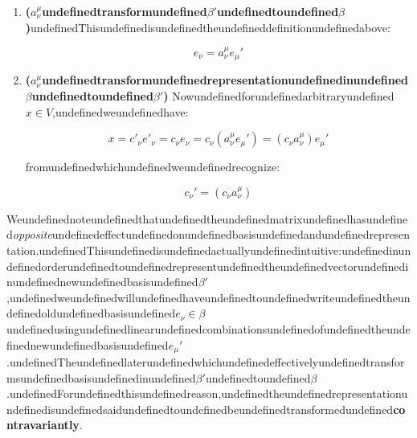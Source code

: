 \begin{enumerate}
\item \textbf{($a_{\nu}^{\mu}$undefinedtransformundefined$\beta'$undefinedtoundefined$\beta$)}undefinedThisundefinedisundefinedtheundefineddefinitionundefinedabove:

\begin{equation}
e_\nu = a_{\nu}^{\mu} e_{\mu}'
\end{equation}


\item \textbf{($a_{\nu}^{\mu}$undefinedtransformundefinedrepresentationundefinedinundefined$\beta$undefinedtoundefined$\beta'$)}
Nowundefinedforundefinedarbitraryundefined$x\in V$,undefinedweundefinedhave:

\begin{equation}
x=c'_{\nu}e'_{\nu}=c_{\nu}e_{\nu} =c_\nu (a_{\nu}^{\mu} e_{\mu}' )=(c_\nu a_{\nu}^{\mu}) e_{\mu}'
\end{equation}


fromundefinedwhichundefinedweundefinedrecognize:

\begin{equation}
c_{\nu}'=(c_{\nu}a_{\nu}^{\mu})
\end{equation}
\end{enumerate}

Weundefinednoteundefinedthatundefinedtheundefinedmatrixundefinedhasundefined\textit{opposite}undefinedeffectundefinedonundefinedbasisundefinedandundefinedrepresentation.undefinedThisundefinedisundefinedactuallyundefinedintuitive:undefinedinundefinedorderundefinedtoundefinedrepresentundefinedtheundefinedvectorundefinedinundefinednewundefinedbasisundefined$\beta'$,undefinedweundefinedwillundefinedhaveundefinedtoundefinedwriteundefinedtheundefinedoldundefinedbasisundefined$e_\nu \in \beta$undefinedusingundefinedlinearundefinedcombinationsundefinedofundefinedtheundefinednewundefinedbasisundefined$e_{\mu}'$.undefinedTheundefinedlaterundefinedwhichundefinedeffectivelyundefinedtransformsundefinedbasisundefinedinundefined$\beta'$undefinedtoundefined$\beta$.undefinedForundefinedthisundefinedreason,undefinedtheundefinedrepresentationundefinedisundefinedsaidundefinedtoundefinedbeundefinedtransformedundefined\textbf{contravariantly}.

